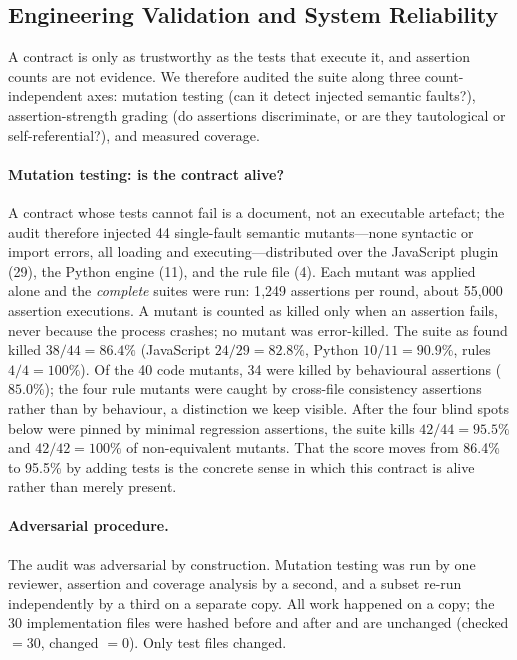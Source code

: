 \subsection{Engineering Validation and System Reliability}\label{sec:engineering}

A contract is only as trustworthy as the tests that execute it, and assertion
counts are not evidence. We therefore audited the suite along three
count-independent axes: mutation testing (can it detect injected semantic
faults?), assertion-strength grading (do assertions discriminate, or are they
tautological or self-referential?), and measured coverage.

\paragraph{Mutation testing: is the contract alive?} A contract whose tests cannot
fail is a document, not an executable artefact; the audit therefore injected 44
single-fault semantic mutants---none syntactic or import errors, all loading and
executing---distributed over the JavaScript plugin (29), the Python engine (11),
and the rule file (4). Each mutant was applied alone and the \emph{complete}
suites were run: 1{,}249 assertions per round, about 55{,}000 assertion
executions. A mutant is counted as killed only when an assertion fails, never
because the process crashes; no mutant was error-killed. The suite as found killed
$38/44=86.4\%$ (JavaScript $24/29=82.8\%$, Python $10/11=90.9\%$, rules
$4/4=100\%$). Of the 40 code mutants, 34 were killed by behavioural assertions
($85.0\%$); the four rule mutants were caught by cross-file consistency
assertions rather than by behaviour, a distinction we keep visible. After the four
blind spots below were pinned by minimal regression assertions, the suite kills
$42/44=95.5\%$ and $42/42=100\%$ of non-equivalent mutants. That the score moves
from 86.4\% to 95.5\% by adding tests is the concrete sense in which this contract
is alive rather than merely present.

\paragraph{Adversarial procedure.} The audit was adversarial by construction.
Mutation testing was run by one reviewer, assertion and coverage analysis by a
second, and a subset re-run independently by a third on a separate copy. All
work happened on a copy; the 30 implementation files were hashed before and
after and are unchanged (checked $=30$, changed $=0$). Only test files changed.

